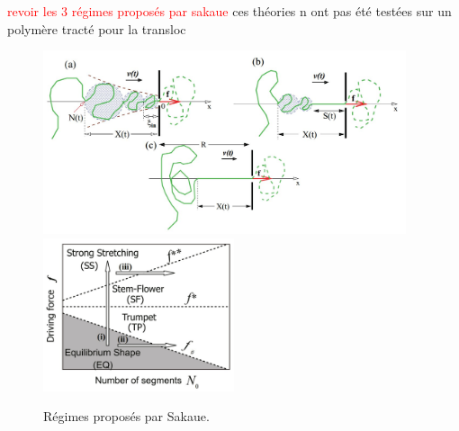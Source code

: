  
 \textcolor{red}{revoir les 3 régimes proposés par sakaue}
 ces théories n ont pas été testées sur un polymère tracté pour la transloc
 
 
 \begin{figure}[H]
\begin{center}
\includegraphics[width=0.95\textwidth]{regimeprofiles.jpg}
\includegraphics[width=0.5\textwidth]{regimedistrib.jpg} 

\caption[Régimes possibles au cours de la translocation]{Régimes proposés par Sakaue.}
\label{regimeprofiles}
\end{center}
\end{figure}

